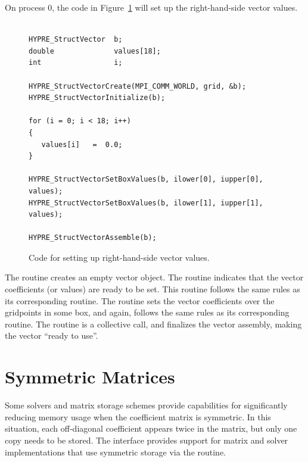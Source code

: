 On process 0, the code in Figure~\ref{fig-struct-rhs} will set up the
right-hand-side vector values.
\begin{figure}
\centering
\begin{minipage}{0.8\textwidth}
\begin{verbatim}

HYPRE_StructVector  b;
double              values[18];
int                 i;

HYPRE_StructVectorCreate(MPI_COMM_WORLD, grid, &b);
HYPRE_StructVectorInitialize(b);

for (i = 0; i < 18; i++)
{
   values[i]   =  0.0;
}

HYPRE_StructVectorSetBoxValues(b, ilower[0], iupper[0], values);
HYPRE_StructVectorSetBoxValues(b, ilower[1], iupper[1], values);

HYPRE_StructVectorAssemble(b);

\end{verbatim}
\end{minipage}
\caption{%
Code for setting up right-hand-side vector values.}
\label{fig-struct-rhs}
\end{figure}
The  routine creates an empty vector object.  The
 routine indicates that the vector coefficients (or values)
are ready to be set.  This routine follows the same rules as its corresponding
 routine.  The  routine sets the vector
coefficients over the gridpoints in some box, and again, follows the same rules
as its corresponding  routine.  The  routine is a
collective call, and finalizes the vector assembly, making the vector ``ready
to use''.


\section{Symmetric Matrices}
\label{sec-Symmetric-Matrices}

Some solvers and matrix storage schemes provide capabilities for significantly
reducing memory usage when the coefficient matrix is symmetric.  In this
situation, each off-diagonal coefficient appears twice in the matrix, but only
one copy needs to be stored.  The  interface provides support for
matrix and solver implementations that use symmetric storage via the
 routine.

